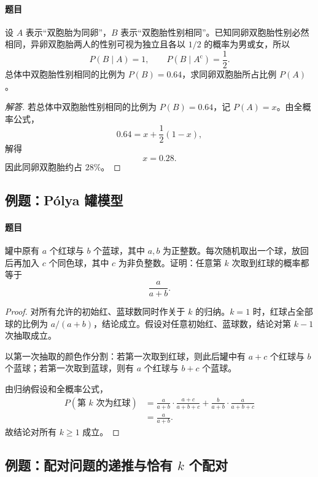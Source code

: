 \paragraph{题目}
设 $A$ 表示“双胞胎为同卵”，$B$ 表示“双胞胎性别相同”。已知同卵双胞胎性别必然相同，异卵双胞胎两人的性别可视为独立且各以 $1/2$ 的概率为男或女，所以
\[
P(B\mid A)=1,
\qquad
P(B\mid A^{\mathrm c})=\frac12.
\]
总体中双胞胎性别相同的比例为 $P(B)=0.64$，求同卵双胞胎所占比例 $P(A)$。

\begin{proof}[解答]
若总体中双胞胎性别相同的比例为 $P(B)=0.64$，记 $P(A)=x$。由全概率公式，
\[
0.64=x+\frac12(1-x),
\]
解得
\[
x=0.28.
\]
因此同卵双胞胎约占 $28\%$。
\end{proof}

\subsection{例题：Pólya 罐模型}\label{note:c1:e17}
\paragraph{题目}
罐中原有 $a$ 个红球与 $b$ 个蓝球，其中 $a,b$ 为正整数。每次随机取出一个球，放回后再加入 $c$ 个同色球，其中 $c$ 为非负整数。证明：任意第 $k$ 次取到红球的概率都等于
\[
\frac{a}{a+b}.
\]

\begin{proof}
对所有允许的初始红、蓝球数同时作关于 $k$ 的归纳。$k=1$ 时，红球占全部球的比例为 $a/(a+b)$，结论成立。假设对任意初始红、蓝球数，结论对第 $k-1$ 次抽取成立。

以第一次抽取的颜色作分割：若第一次取到红球，则此后罐中有 $a+c$ 个红球与 $b$ 个蓝球；若第一次取到蓝球，则有 $a$ 个红球与 $b+c$ 个蓝球。

由归纳假设和全概率公式，
\[
\begin{aligned}
P(\text{第 $k$ 次为红球})
&=\frac{a}{a+b}\cdot\frac{a+c}{a+b+c}
+\frac{b}{a+b}\cdot\frac{a}{a+b+c}\\
&=\frac{a}{a+b}.
\end{aligned}
\]
故结论对所有 $k\geq1$ 成立。
\end{proof}

\subsection{例题：\texorpdfstring{配对问题的递推与恰有 $k$ 个配对}{配对问题的递推与恰有 k 个配对}}\label{note:c1:e18}
